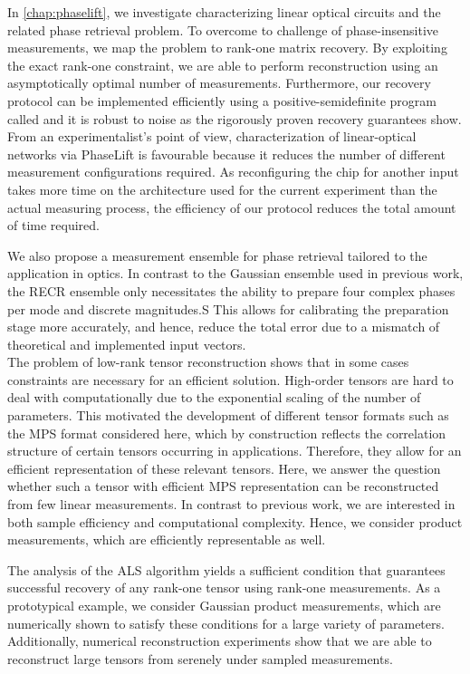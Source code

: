 In \cref{chap:phaselift}, we investigate characterizing linear optical circuits and the related phase retrieval problem.
To overcome to challenge of phase-insensitive measurements, we map the problem to rank-one matrix recovery.
By exploiting the exact rank-one constraint, we are able to perform reconstruction using an asymptotically optimal number of measurements.
Furthermore, our recovery protocol can be implemented efficiently using a positive-semidefinite program called  and it is robust to noise as the rigorously proven recovery guarantees show.
From an experimentalist's point of view, characterization of linear-optical networks via PhaseLift is favourable because it reduces the number of different measurement configurations required.
As reconfiguring the chip for another input takes more time on the architecture used for the current experiment than the actual measuring process, the efficiency of our protocol reduces the total amount of time required.

We also propose a measurement ensemble for phase retrieval tailored to the application in optics.
In contrast to the Gaussian ensemble used in previous work, the RECR ensemble only necessitates the ability to prepare four complex phases per mode and discrete magnitudes.S
This allows for calibrating the preparation stage more accurately, and hence, reduce the total error due to a mismatch of theoretical and implemented input vectors.\\


The problem of low-rank tensor reconstruction shows that in some cases constraints are necessary for an efficient solution.
High-order tensors are hard to deal with computationally due to the exponential scaling of the number of parameters.
This motivated the development of different tensor formats such as the MPS format considered here, which by construction reflects the correlation structure of certain tensors occurring in applications.
Therefore, they allow for an efficient representation of these relevant tensors.
Here, we answer the question whether such a tensor with efficient MPS representation can be reconstructed from few linear measurements.
In contrast to previous work, we are interested in both sample efficiency and computational complexity.
Hence, we consider product measurements, which are efficiently representable as well.

The analysis of the ALS algorithm yields a sufficient condition that guarantees successful recovery of any rank-one tensor using rank-one measurements.
As a prototypical example, we consider Gaussian product measurements, which are numerically shown to satisfy these conditions for a large variety of parameters.
Additionally, numerical reconstruction experiments show that we are able to reconstruct large tensors from serenely under sampled measurements.


